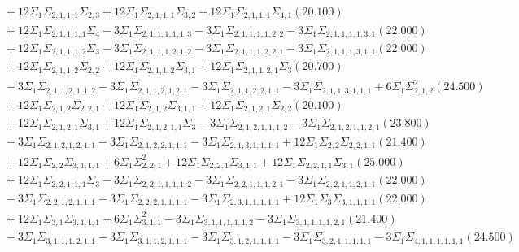 \documentclass[12pt]{article}
\begin{document}
\begin{landscape}
\begin{align*}
		&\quad\quad +12\Sigma_{1}\Sigma_{2,1,1,1}\Sigma_{2,3}+12\Sigma_{1}\Sigma_{2,1,1,1}\Sigma_{3,2}+12\Sigma_{1}\Sigma_{2,1,1,1}\Sigma_{4,1}(20.100) \\ 
		&\quad\quad +12\Sigma_{1}\Sigma_{2,1,1,1,1}\Sigma_{4}-3\Sigma_{1}\Sigma_{2,1,1,1,1,1,3}-3\Sigma_{1}\Sigma_{2,1,1,1,1,2,2}-3\Sigma_{1}\Sigma_{2,1,1,1,1,3,1}(22.000) \\ 
		&\quad\quad +12\Sigma_{1}\Sigma_{2,1,1,1,2}\Sigma_{3}-3\Sigma_{1}\Sigma_{2,1,1,1,2,1,2}-3\Sigma_{1}\Sigma_{2,1,1,1,2,2,1}-3\Sigma_{1}\Sigma_{2,1,1,1,3,1,1}(22.000) \\ 
		&\quad\quad +12\Sigma_{1}\Sigma_{2,1,1,2}\Sigma_{2,2}+12\Sigma_{1}\Sigma_{2,1,1,2}\Sigma_{3,1}+12\Sigma_{1}\Sigma_{2,1,1,2,1}\Sigma_{3}(20.700) \\ 
		&\quad\quad -3\Sigma_{1}\Sigma_{2,1,1,2,1,1,2}-3\Sigma_{1}\Sigma_{2,1,1,2,1,2,1}-3\Sigma_{1}\Sigma_{2,1,1,2,2,1,1}-3\Sigma_{1}\Sigma_{2,1,1,3,1,1,1}+6\Sigma_{1}\Sigma_{2,1,2}^{2}(24.500) \\ 
		&\quad\quad +12\Sigma_{1}\Sigma_{2,1,2}\Sigma_{2,2,1}+12\Sigma_{1}\Sigma_{2,1,2}\Sigma_{3,1,1}+12\Sigma_{1}\Sigma_{2,1,2,1}\Sigma_{2,2}(20.100) \\ 
		&\quad\quad +12\Sigma_{1}\Sigma_{2,1,2,1}\Sigma_{3,1}+12\Sigma_{1}\Sigma_{2,1,2,1,1}\Sigma_{3}-3\Sigma_{1}\Sigma_{2,1,2,1,1,1,2}-3\Sigma_{1}\Sigma_{2,1,2,1,1,2,1}(23.800) \\ 
		&\quad\quad -3\Sigma_{1}\Sigma_{2,1,2,1,2,1,1}-3\Sigma_{1}\Sigma_{2,1,2,2,1,1,1}-3\Sigma_{1}\Sigma_{2,1,3,1,1,1,1}+12\Sigma_{1}\Sigma_{2,2}\Sigma_{2,2,1,1}(21.400) \\ 
		&\quad\quad +12\Sigma_{1}\Sigma_{2,2}\Sigma_{3,1,1,1}+6\Sigma_{1}\Sigma_{2,2,1}^{2}+12\Sigma_{1}\Sigma_{2,2,1}\Sigma_{3,1,1}+12\Sigma_{1}\Sigma_{2,2,1,1}\Sigma_{3,1}(25.000) \\ 
		&\quad\quad +12\Sigma_{1}\Sigma_{2,2,1,1,1}\Sigma_{3}-3\Sigma_{1}\Sigma_{2,2,1,1,1,1,2}-3\Sigma_{1}\Sigma_{2,2,1,1,1,2,1}-3\Sigma_{1}\Sigma_{2,2,1,1,2,1,1}(22.000) \\ 
		&\quad\quad -3\Sigma_{1}\Sigma_{2,2,1,2,1,1,1}-3\Sigma_{1}\Sigma_{2,2,2,1,1,1,1}-3\Sigma_{1}\Sigma_{2,3,1,1,1,1,1}+12\Sigma_{1}\Sigma_{3}\Sigma_{3,1,1,1,1}(22.000) \\ 
		&\quad\quad +12\Sigma_{1}\Sigma_{3,1}\Sigma_{3,1,1,1}+6\Sigma_{1}\Sigma_{3,1,1}^{2}-3\Sigma_{1}\Sigma_{3,1,1,1,1,1,2}-3\Sigma_{1}\Sigma_{3,1,1,1,1,2,1}(21.400) \\ 
		&\quad\quad -3\Sigma_{1}\Sigma_{3,1,1,1,2,1,1}-3\Sigma_{1}\Sigma_{3,1,1,2,1,1,1}-3\Sigma_{1}\Sigma_{3,1,2,1,1,1,1}-3\Sigma_{1}\Sigma_{3,2,1,1,1,1,1}-3\Sigma_{1}\Sigma_{4,1,1,1,1,1,1}(24.500) \\ 

\end{align*}
\end{landscape}
\end{document}
